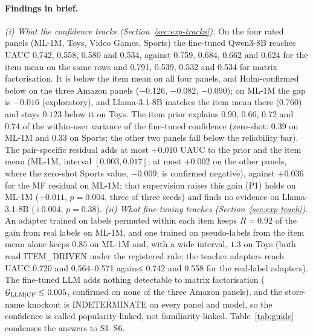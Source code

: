 \paragraph{Findings in brief.}
\emph{(i) What the confidence tracks (Section~\ref{sec:exp-tracks}).} On the four rated panels (ML-1M, Toys, Video Games, Sports) the
fine-tuned Qwen3-8B reaches UAUC 0.742, 0.558, 0.580 and 0.534, against 0.759, 0.684, 0.662 and 0.624 for the item mean on the same
rows and 0.791, 0.539, 0.532 and 0.534 for matrix factorisation. It is below the item mean on all four panels, and Holm-confirmed
below on the three Amazon panels ($-0.126$, $-0.082$, $-0.090$); on ML-1M the gap is $-0.016$ (exploratory), and Llama-3.1-8B
matches the item mean there (0.760) and stays $0.123$ below it on Toys. The item prior explains 0.90, 0.66, 0.72 and 0.74 of the
within-user variance of the fine-tuned confidence (zero-shot: 0.39 on ML-1M and 0.33 on Sports; the other two panels fall below the
reliability bar). The pair-specific residual adds at most $+0.010$ UAUC to the prior and the item mean (ML-1M, interval
$[0.003,0.017]$; at most $+0.002$ on the other panels, where the zero-shot Sports value, $-0.009$, is confirmed negative), against
$+0.036$ for the MF residual on ML-1M; that supervision raises this gain (P1) holds on ML-1M ($+0.011$, $p=0.004$, three of
three seeds) and finds no evidence on Llama-3.1-8B ($+0.004$, $p=0.38$).
\emph{(ii) What fine-tuning teaches (Section~\ref{sec:exp-teach}).} An adapter trained on labels permuted within each item keeps
$R=0.92$ of the gain from real labels on ML-1M, and one trained on pseudo-labels from the item mean alone keeps $0.85$ on ML-1M
and, with a wide interval, $1.3$ on Toys (both read ITEM\_DRIVEN under the registered rule; the teacher adapters reach UAUC 0.720
and 0.564--0.571 against 0.742 and 0.558 for the real-label adapters). The fine-tuned LLM adds nothing detectable to matrix
factorisation ($\mathcal G_{\rm LLM|CF}\le0.005$, confirmed on none of the three Amazon panels), and the store-name knockout is
INDETERMINATE on every panel and model, so the confidence is called popularity-linked, not familiarity-linked.
Table~\ref{tab:guide} condenses the answers to S1--S6.
